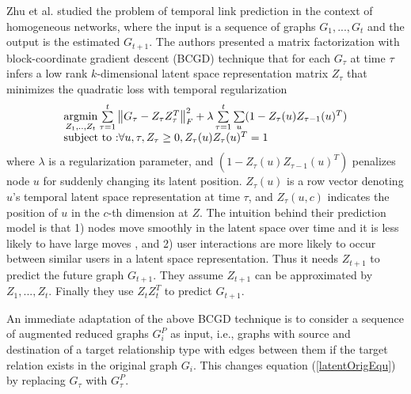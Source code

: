Zhu et al. \cite{Zhu2016} studied the problem of temporal link prediction in the context of homogeneous networks, where the input is a sequence of graphs $G_1, ..., G_t$ and the output is the estimated $G_{t+1}$. The authors presented a matrix factorization with block-coordinate gradient descent (BCGD) technique that for each $G_\tau$ at time $\tau$ infers a low rank $k$-dimensional latent space representation matrix $Z_\tau$ that minimizes the quadratic loss with temporal regularization
\begin{equation}\label{latentOrigEqu}
    \begin{array}{l}
\operatorname*{argmin}\limits_{Z_1, .., Z_t}\sum\limits_{\tau=1}^{t}\left \| G_\tau-Z_{\tau}Z_{\tau}^T \right \|^2_F+\lambda \sum\limits_{\tau=1}^{t}\sum\limits_{u}(1-Z_{\tau}(u)Z_{\tau-1}(u)^T) 
\\
\text{subject to :} \forall u,\tau,Z_{\tau}\geq 0, Z_{\tau}(u)Z_{\tau}(u)^T=1
    \end{array}
\end{equation}
where $\lambda$ is a regularization parameter, and  $(1-Z_{\tau}(u)Z_{\tau-1}(u)^T)$ penalizes node $u$ for suddenly changing its latent position. %
$Z_\tau(u)$ is a row vector denoting $u$'s temporal latent space representation at time $\tau$, and $Z_\tau(u,c)$ indicates the position of $u$ in the $c$-th dimension at $Z$. The intuition behind their prediction model is that 1) nodes move smoothly in the latent space over time and it is less likely to have large moves \cite{sarkar2005dynamic,zhang2014inferring}, and 2) user interactions are more likely to occur between similar users in a latent space representation. Thus it needs $Z_{t+1}$ to predict the future graph $G_{t+1}$. They assume $Z_{t+1}$ can be approximated by $Z_1, ..., Z_t$. Finally they use $Z_tZ_t^T$ to predict $G_{t+1}$. 

An immediate adaptation of the above BCGD technique is to consider a sequence of augmented reduced graphs $G^P_i$ as input, i.e., graphs with source and destination of a target relationship type with edges between them if the target relation exists in the original graph $G_i$. This changes equation (\ref{latentOrigEqu}) by replacing $G_\tau$ with $G^{P}_\tau$.


